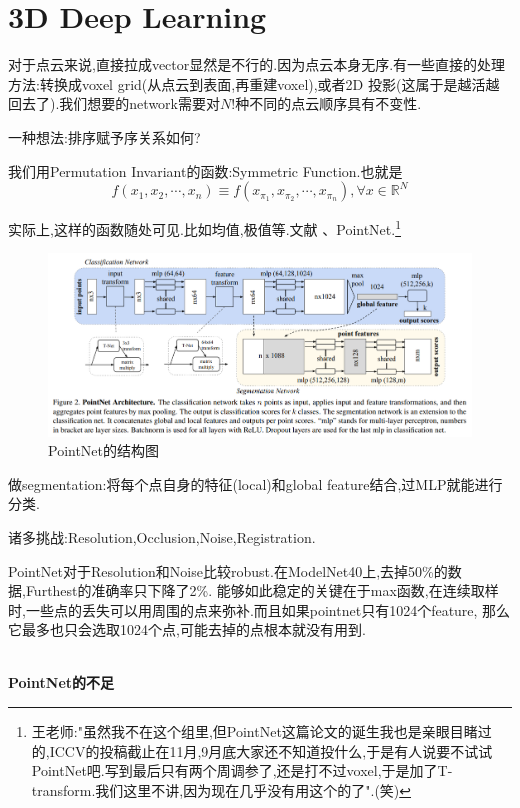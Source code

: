 \chapter{3D Deep Learning}

对于点云来说,直接拉成vector显然是不行的.因为点云本身无序.有一些直接的处理方法:转换成voxel grid(从点云到表面,再重建voxel),或者2D 投影(这属于是越活越回去了).我们想要的network需要对$N!$种不同的点云顺序具有不变性.

一种想法:排序赋予序关系如何?

我们用Permutation Invariant的函数:Symmetric Function.也就是
\begin{equation}
    f(x_1, x_2, \cdots, x_n) \equiv f(x_{\pi_1}, x_{\pi_2}, \cdots, x_{\pi_n}), \forall x \in \mathbb R^N
\end{equation}

实际上,这样的函数随处可见.比如均值,极值等.文献\cite{PointNet} 、PointNet.\footnote{王老师:"虽然我不在这个组里,但PointNet这篇论文的诞生我也是亲眼目睹过的,ICCV的投稿截止在11月,9月底大家还不知道投什么,于是有人说要不试试PointNet吧.写到最后只有两个周调参了,还是打不过voxel,于是加了T-transform.我们这里不讲,因为现在几乎没有用这个的了".(笑)}

\begin{figure}[htbp]
    \centering
    \includegraphics[scale=0.6]{figures/PointNet.png}
    \caption{PointNet的结构图}
\end{figure}

做segmentation:将每个点自身的特征(local)和global feature结合,过MLP就能进行分类.

诸多挑战:Resolution,Occlusion,Noise,Registration.

PointNet对于Resolution和Noise比较robust.在ModelNet40上,去掉50\%的数据,Furthest的准确率只下降了2\%.
能够如此稳定的关键在于max函数,在连续取样时,一些点的丢失可以用周围的点来弥补.而且如果pointnet只有1024个feature,
那么它最多也只会选取1024个点,可能去掉的点根本就没有用到.

\textbf{\\PointNet的不足}

